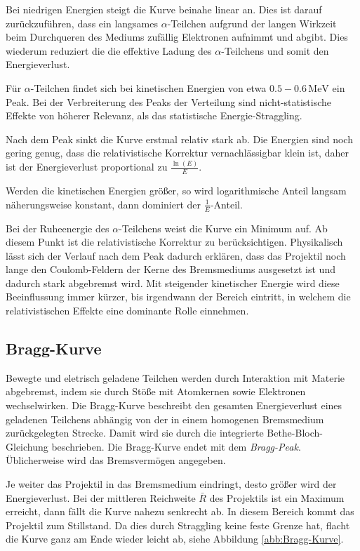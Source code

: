 \documentclass[12pt,a4paper]{scrartcl}
\numberwithin{equation}{section} %
\renewcommand{\[}{} %
\renewcommand{\]}{\noindent} %
\begin{document}
Bei niedrigen Energien steigt die Kurve beinahe linear an. Dies ist
darauf zurückzuführen, dass ein langsames $\alpha$-Teilchen aufgrund
der langen Wirkzeit beim Durchqueren des Mediums zufällig Elektronen
aufnimmt und abgibt. Dies wiederum reduziert die die effektive Ladung
des $\alpha$-Teilchens und somit den Energieverlust.

Für $\alpha$-Teilchen findet sich bei kinetischen Energien von etwa
$0.5-0.6\mathrm{\,MeV}$ ein Peak. Bei der Verbreiterung des Peaks der
Verteilung sind nicht-statistische Effekte von höherer Relevanz, als das
statistische Energie-Straggling.

Nach dem Peak sinkt die Kurve erstmal relativ stark ab. Die Energien
sind noch gering genug, dass die relativistische Korrektur
vernachlässigbar klein ist, daher ist der Energieverlust proportional zu
$\frac{\ln(E)}{E}$.

Werden die kinetischen Energien größer, so wird logarithmische Anteil
langsam näherungsweise konstant, dann dominiert der
$\frac{1}{E}$-Anteil.

Bei der Ruheenergie des $\alpha$-Teilchens weist die Kurve ein Minimum
auf. Ab diesem Punkt ist die relativistische Korrektur zu
berücksichtigen. Physikalisch lässt sich der Verlauf nach dem Peak
dadurch erklären, dass das Projektil noch lange den Coulomb-Feldern der
Kerne des Bremsmediums ausgesetzt ist und dadurch stark abgebremst wird.
Mit steigender kinetischer Energie wird diese Beeinflussung immer
kürzer, bis irgendwann der Bereich eintritt, in welchem die
relativistischen Effekte eine dominante Rolle einnehmen.

\hypertarget{bragg-kurve}{%
\subsection{Bragg-Kurve}\label{bragg-kurve}}

Bewegte und eletrisch geladene Teilchen werden durch Interaktion mit
Materie abgebremst, indem sie durch Stöße mit Atomkernen sowie
Elektronen wechselwirken. Die Bragg-Kurve beschreibt den gesamten
Energieverlust eines geladenen Teilchens abhängig von der in einem
homogenen Bremsmedium zurückgelegten Strecke. Damit wird sie durch die
integrierte Bethe-Bloch-Gleichung beschrieben. Die Bragg-Kurve endet mit
dem \emph{Bragg-Peak}. Üblicherweise wird das Bremsvermögen angegeben.

Je weiter das Projektil in das Bremsmedium eindringt, desto größer wird
der Energieverlust. Bei der mittleren Reichweite $\bar R$ des
Projektils ist ein Maximum erreicht, dann fällt die Kurve nahezu
senkrecht ab. In diesem Bereich kommt das Projektil zum Stillstand. Da
dies durch Straggling keine feste Grenze hat, flacht die Kurve ganz am
Ende wieder leicht ab, siehe Abbildung \ref{abb:Bragg-Kurve}.
\end{document}
